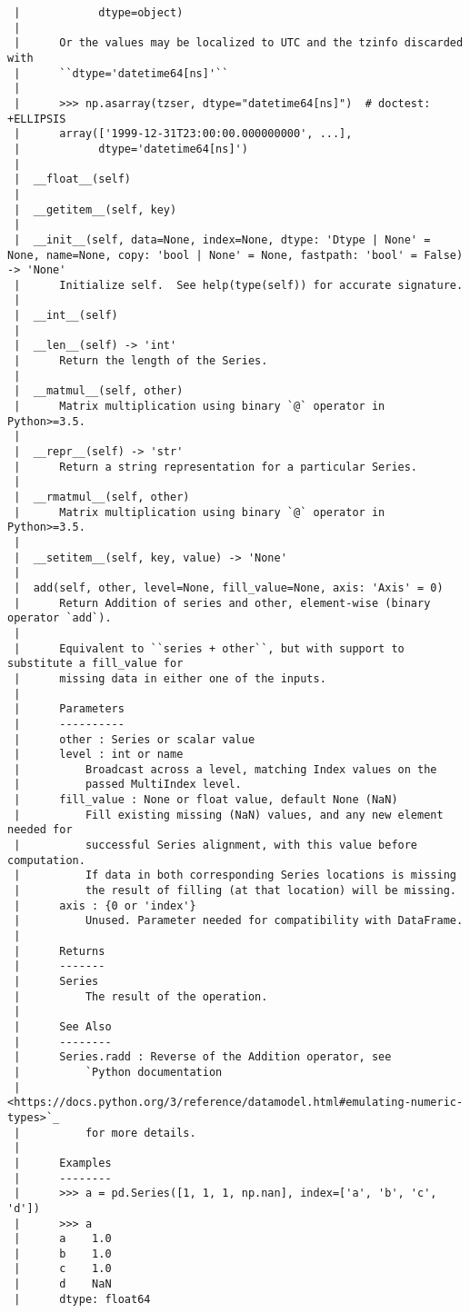 \documentclass[
  letterpaper,
  DIV=11,
  numbers=noendperiod]{scrreprt}
\begin{document}
\begin{verbatim}
 |            dtype=object)
 |      
 |      Or the values may be localized to UTC and the tzinfo discarded with
 |      ``dtype='datetime64[ns]'``
 |      
 |      >>> np.asarray(tzser, dtype="datetime64[ns]")  # doctest: +ELLIPSIS
 |      array(['1999-12-31T23:00:00.000000000', ...],
 |            dtype='datetime64[ns]')
 |  
 |  __float__(self)
 |  
 |  __getitem__(self, key)
 |  
 |  __init__(self, data=None, index=None, dtype: 'Dtype | None' = None, name=None, copy: 'bool | None' = None, fastpath: 'bool' = False) -> 'None'
 |      Initialize self.  See help(type(self)) for accurate signature.
 |  
 |  __int__(self)
 |  
 |  __len__(self) -> 'int'
 |      Return the length of the Series.
 |  
 |  __matmul__(self, other)
 |      Matrix multiplication using binary `@` operator in Python>=3.5.
 |  
 |  __repr__(self) -> 'str'
 |      Return a string representation for a particular Series.
 |  
 |  __rmatmul__(self, other)
 |      Matrix multiplication using binary `@` operator in Python>=3.5.
 |  
 |  __setitem__(self, key, value) -> 'None'
 |  
 |  add(self, other, level=None, fill_value=None, axis: 'Axis' = 0)
 |      Return Addition of series and other, element-wise (binary operator `add`).
 |      
 |      Equivalent to ``series + other``, but with support to substitute a fill_value for
 |      missing data in either one of the inputs.
 |      
 |      Parameters
 |      ----------
 |      other : Series or scalar value
 |      level : int or name
 |          Broadcast across a level, matching Index values on the
 |          passed MultiIndex level.
 |      fill_value : None or float value, default None (NaN)
 |          Fill existing missing (NaN) values, and any new element needed for
 |          successful Series alignment, with this value before computation.
 |          If data in both corresponding Series locations is missing
 |          the result of filling (at that location) will be missing.
 |      axis : {0 or 'index'}
 |          Unused. Parameter needed for compatibility with DataFrame.
 |      
 |      Returns
 |      -------
 |      Series
 |          The result of the operation.
 |      
 |      See Also
 |      --------
 |      Series.radd : Reverse of the Addition operator, see
 |          `Python documentation
 |          <https://docs.python.org/3/reference/datamodel.html#emulating-numeric-types>`_
 |          for more details.
 |      
 |      Examples
 |      --------
 |      >>> a = pd.Series([1, 1, 1, np.nan], index=['a', 'b', 'c', 'd'])
 |      >>> a
 |      a    1.0
 |      b    1.0
 |      c    1.0
 |      d    NaN
 |      dtype: float64

\end{verbatim}
\end{document}
